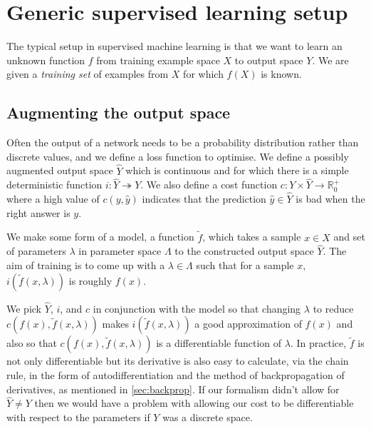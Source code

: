 \section{Generic supervised learning setup}
The typical setup in supervised machine learning is %
that
we want to learn an unknown function $f$ from training example space $X$ to output space $Y$.
We are given a \emph{training set} of examples from $X$ for which $f(X)$ is known. 
\subsection{Augmenting the output space}
Often the output of a network needs to be a probability distribution rather than discrete values, and we define a loss function to optimise.
We define a possibly augmented output space $\hat Y$ which is continuous and for which there is a simple deterministic function $i:\hat Y\twoheadrightarrow Y$. 
We also define a cost function $c:Y\times\hat Y\to \mathbb{R}^+_0$ 
where a high value of $c(y,\hat y)$ indicates that the prediction $\hat y\in \hat Y$ is bad when the right answer is $y$.

We make some form of a model, a function $\tilde f$, which takes a sample $x\in X$ and set of parameters $\lambda$ in parameter space $\Lambda$ to the constructed output space $\hat Y$. The aim of training is to come up with a $\lambda\in\Lambda$ such that for a sample $x$, $i(\tilde f(x,\lambda))$ is roughly $f(x)$. 

We pick $\hat Y$, $i$, and $c$ in conjunction with the model so that changing $\lambda$ to reduce $c(f(x),\tilde f(x,\lambda))$ makes $i(\tilde f(x,\lambda))$ a good approximation of $f(x)$ and also so that $c(f(x),\tilde f(x,\lambda))$ is a differentiable function of $\lambda$.
In practice, $\tilde f$ is not only differentiable but its derivative is also easy to calculate, via the chain rule, in the form of autodifferentiation and the method of backpropagation of derivatives, as mentioned in \autoref{sec:backprop}.
If our formalism didn't allow for $\hat Y\ne Y$ then we would have a problem with allowing our cost to be differentiable with respect to the parameters if $Y$ was a discrete space.


